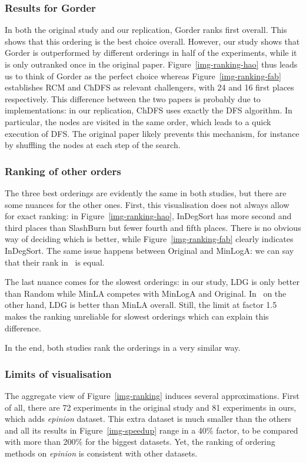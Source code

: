 \subsubsection{Results for Gorder}
In both the original study and our replication, Gorder ranks first overall. This shows that this ordering is the best choice overall. However, our study shows that Gorder is outperformed by different orderings in half of the experiments, while it is only outranked once in the original paper. Figure~\ref{img-ranking-hao} thus leads us to think of Gorder as the perfect choice whereas Figure~\ref{img-ranking-fab} establishes RCM and ChDFS as relevant challengers, with 24 and 16 first places respectively.
%
This difference between the two papers is probably due to implementations: in our replication, ChDFS uses exactly the DFS algorithm. In particular, the nodes are visited in the same order, which leads to a quick execution of DFS. The original paper likely prevents this mechanism, for instance by shuffling the nodes at each step of the search.

\subsubsection{Ranking of other orders}
The three best orderings are evidently the same in both studies, but there are some nuances for the other ones. First, this visualisation does not always allow for exact ranking: in Figure~\ref{img-ranking-hao}, InDegSort has more second and third places than SlashBurn but fewer fourth and fifth places. There is no obvious way of deciding which is better, while Figure~\ref{img-ranking-fab} clearly indicates InDegSort. The same issue happens between Original and MinLogA: we can say that their rank in~\cite{gorder} is equal.

The last nuance comes for the slowest orderings: in our study, LDG is only better than Random while MinLA competes with MinLogA and Original. In~\cite{gorder} on the other hand, LDG is better than MinLA overall. Still, the limit at factor 1.5 makes the ranking unreliable for slowest orderings which can explain this difference.

In the end, both studies rank the orderings in a very similar way.

\subsubsection{Limits of visualisation}
The aggregate view of Figure~\ref{img-ranking} induces several approximations. First of all, there are 72 experiments in the original study and 81 experiments in ours, which adds \textit{epinion} dataset. This extra dataset is much smaller than the others and all its results in Figure~\ref{img-speedup} range in a 40\% factor, to be compared with more than 200\% for the biggest datasets. Yet, the ranking of ordering methods on \textit{epinion} is consistent with other datasets.

